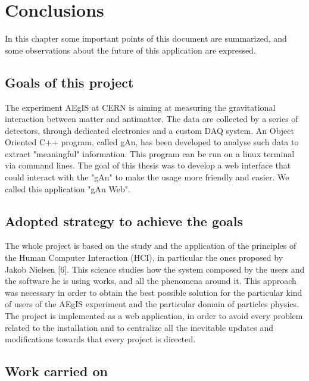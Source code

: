 
\chapter{Conclusions} %

\label{Chapter 10} %


In this chapter some important points of this document are summarized, and some observations about the future of this application are expressed.

\section{Goals of this project}
The experiment AEgIS at CERN is aiming at measuring the gravitational interaction between matter and antimatter. The data are collected by a series of detectors, through dedicated electronics and a custom DAQ system. An Object Oriented C++ program, called gAn, has been developed to analyse such data to extract "meaningful" information. This program can be run on a linux terminal via command lines. The goal of this thesis was to develop a web interface that could interact with the "gAn" to make the usage more friendly and easier. We called this application "gAn Web". 

\section{Adopted strategy to achieve the goals}
The whole project is based on the study and the application of the principles of the Human Computer Interaction (HCI), in particular the ones proposed by Jakob Nielsen [6]. This science studies how the system composed by the users and the software he is using works, and all the phenomena around it. This approach was necessary in order to obtain the best possible solution for the particular kind of users of the AEgIS experiment and the particular domain of particles physics. 
The project is implemented as a web application, in order to avoid every problem related to the installation and to centralize all the inevitable updates and modifications towards that every project is directed. 

\section{Work carried on}

